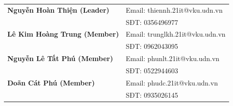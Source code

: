 \documentclass[12pt,a4paper]{article}
\begin{document}
\begin{tcolorbox}[colback=white, colframe=guardianblue, arc=3mm, title=Thông tin liên hệ đội AIGenerated]
\begin{tabular}{@{}p{4.5cm}|p{8cm}@{}}
\textbf{Nguyễn Hoàn Thiện (Leader)} & 
Email: thiennh.21it@vku.udn.vn \\
& SĐT: 0356496977 \\
\midrule
\textbf{Lê Kim Hoàng Trung (Member)} & 
Email: trunglkh.21it@vku.udn.vn \\
& SĐT: 0962043095 \\
\midrule
\textbf{Nguyễn Lê Tất Phú (Member)} & 
Email: phunlt.21it@vku.udn.vn \\
& SĐT: 0522944603 \\
\midrule
\textbf{Doãn Cát Phú (Member)} & 
Email: phudc.21it@vku.udn.vn \\
& SĐT: 0935026145 \\

\end{tabular}
\end{tcolorbox}
\end{document}

